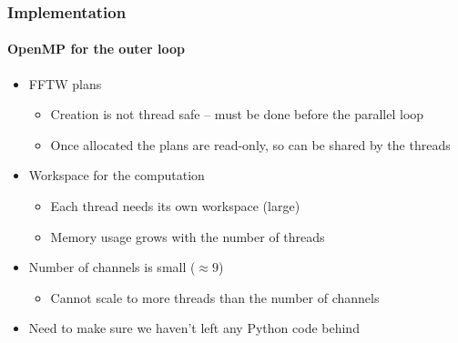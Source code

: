 \documentclass[aspectratio=169]{beamer}
\begin{document}
\begin{frame}
    \frametitle{Implementation}
    \framesubtitle{OpenMP for the outer loop}
    
    \begin{itemize}
      \item FFTW plans
        \begin{itemize}
            \small{}
            \item Creation is not thread safe -- must be done before the parallel loop
            \item Once allocated the plans are read-only, so can be shared by the threads
        \end{itemize}
      \item Workspace for the computation
        \begin{itemize}
            \small{}
            \item Each thread needs its own workspace (large)
            \item Memory usage grows with the number of threads
        \end{itemize}
      \item Number of channels is small ($\approx 9$)
        \begin{itemize}
            \item Cannot scale to more threads than the number of channels
        \end{itemize}
      \item Need to make sure we haven't left any Python code behind
    \end{itemize}

\end{frame}
\end{document}
